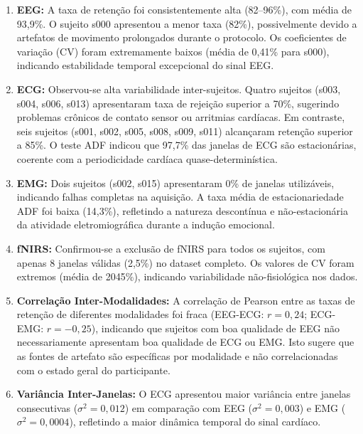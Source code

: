\begin{enumerate}
    \item \textbf{EEG:} A taxa de retenção foi consistentemente alta (82--96\%), com média de 93,9\%. O sujeito s000 apresentou a menor taxa (82\%), possivelmente devido a artefatos de movimento prolongados durante o protocolo. Os coeficientes de variação (CV) foram extremamente baixos (média de 0,41\% para s000), indicando estabilidade temporal excepcional do sinal EEG.

    \item \textbf{ECG:} Observou-se alta variabilidade inter-sujeitos. Quatro sujeitos (s003, s004, s006, s013) apresentaram taxa de rejeição superior a 70\%, sugerindo problemas crônicos de contato sensor ou arritmias cardíacas. Em contraste, seis sujeitos (s001, s002, s005, s008, s009, s011) alcançaram retenção superior a 85\%. O teste ADF indicou que 97,7\% das janelas de ECG são estacionárias, coerente com a periodicidade cardíaca quase-determinística.

    \item \textbf{EMG:} Dois sujeitos (s002, s015) apresentaram 0\% de janelas utilizáveis, indicando falhas completas na aquisição. A taxa média de estacionariedade ADF foi baixa (14,3\%), refletindo a natureza descontínua e não-estacionária da atividade eletromiográfica durante a indução emocional.

    \item \textbf{fNIRS:} Confirmou-se a exclusão de fNIRS para todos os sujeitos, com apenas 8 janelas válidas (2,5\%) no dataset completo. Os valores de CV foram extremos (média de 2045\%), indicando variabilidade não-fisiológica nos dados.

    \item \textbf{Correlação Inter-Modalidades:} A correlação de Pearson entre as taxas de retenção de diferentes modalidades foi fraca (EEG-ECG: $r = 0{,}24$; ECG-EMG: $r = -0{,}25$), indicando que sujeitos com boa qualidade de EEG não necessariamente apresentam boa qualidade de ECG ou EMG. Isto sugere que as fontes de artefato são específicas por modalidade e não correlacionadas com o estado geral do participante.

    \item \textbf{Variância Inter-Janelas:} O ECG apresentou maior variância entre janelas consecutivas ($\sigma^2 = 0{,}012$) em comparação com EEG ($\sigma^2 = 0{,}003$) e EMG ($\sigma^2 = 0{,}0004$), refletindo a maior dinâmica temporal do sinal cardíaco.
\end{enumerate}

